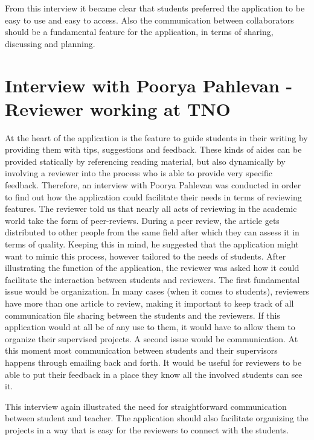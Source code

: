 From this interview it became clear that students preferred the application to be easy to use and easy to access. Also the communication between collaborators should be a fundamental feature for the application, in terms of sharing, discussing and planning. 

\section{Interview with Poorya Pahlevan - Reviewer working at TNO}
At the heart of the application is the feature to guide students in their writing by providing them with tips, suggestions and feedback. These kinds of aides can be provided statically by referencing reading material, but also dynamically by involving a reviewer into the process who is able to provide very specific feedback. Therefore, an interview with Poorya Pahlevan was conducted in order to find out how the application could facilitate their needs in terms of reviewing features. The reviewer told us that nearly all acts of reviewing in the academic world take the form of peer-reviews. During a peer review, the article gets distributed to other people from the same field after which they can assess it in terms of quality. Keeping this in mind, he suggested that the application might want to mimic this process, however tailored to the needs of students.
After illustrating the function of the application, the reviewer was asked how it could facilitate the interaction between students and reviewers. The first fundamental issue would be organization. In many cases (when it comes to students), reviewers have more than one article to review, making it important to keep track of all communication file sharing between the students and the reviewers. If this application would at all be of any use to them, it would have to allow them to organize their supervised projects. A second issue would be communication. At this moment most communication between students and their supervisors happens through emailing back and forth. It would be useful for reviewers to be able to put their feedback in a place they know all the involved students can see it.

This interview again illustrated the need for straightforward communication between student and teacher. The application should also facilitate organizing the projects in a way that is easy for the reviewers to connect with the students.

